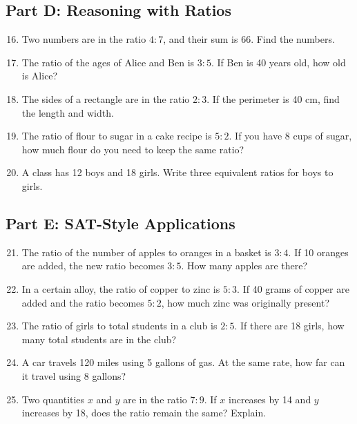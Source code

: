 \documentclass[14pt]{extarticle}
\begin{document}
\subsection*{Part D: Reasoning with Ratios}
\begin{enumerate}
  \setcounter{enumi}{15}
  \item Two numbers are in the ratio \(4:7\), and their sum is 66. Find the numbers.
  \item The ratio of the ages of Alice and Ben is \(3:5\). If Ben is 40 years old, how old is Alice?
  \item The sides of a rectangle are in the ratio \(2:3\). If the perimeter is 40 cm, find the length and width.
  \item The ratio of flour to sugar in a cake recipe is \(5:2\). If you have 8 cups of sugar, how much flour do you need to keep the same ratio?
  \item A class has 12 boys and 18 girls. Write three equivalent ratios for boys to girls.
\end{enumerate}

\subsection*{Part E: SAT-Style Applications}
\begin{enumerate}
  \setcounter{enumi}{20}
  \item The ratio of the number of apples to oranges in a basket is \(3:4\). If 10 oranges are added, the new ratio becomes \(3:5\). How many apples are there?
  \item In a certain alloy, the ratio of copper to zinc is \(5:3\). If 40 grams of copper are added and the ratio becomes \(5:2\), how much zinc was originally present?
  \item The ratio of girls to total students in a club is \(2:5\). If there are 18 girls, how many total students are in the club?
  \item A car travels 120 miles using 5 gallons of gas. At the same rate, how far can it travel using 8 gallons?
  \item Two quantities \(x\) and \(y\) are in the ratio \(7:9\). If \(x\) increases by 14 and \(y\) increases by 18, does the ratio remain the same? Explain.
\end{enumerate}

\newpage
\end{document}
